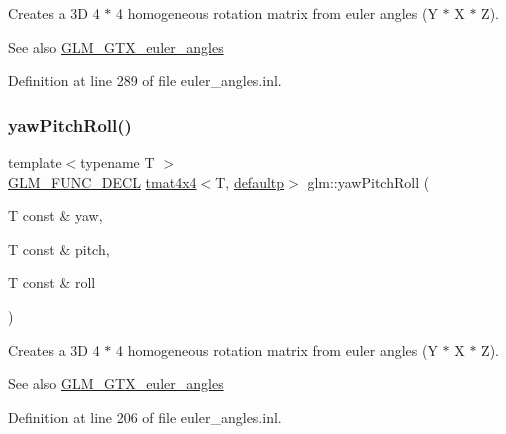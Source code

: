 Creates a 3D 4 $\ast$ 4 homogeneous rotation matrix from euler angles (Y $\ast$ X $\ast$ Z). \begin{DoxySeeAlso}{See also}
\mbox{\hyperlink{group__gtx__euler__angles}{G\+L\+M\+\_\+\+G\+T\+X\+\_\+euler\+\_\+angles}} 
\end{DoxySeeAlso}


Definition at line 289 of file euler\+\_\+angles.\+inl.

\mbox{\label{group__gtx__euler__angles_gaf9c8d0f1df88c5344165600774489bc5}} 
\subsubsection{\texorpdfstring{yawPitchRoll()}{yawPitchRoll()}}
{\footnotesize\ttfamily template$<$typename T $>$ \\
\mbox{\hyperlink{setup_8hpp_ab2d052de21a70539923e9bcbf6e83a51}{G\+L\+M\+\_\+\+F\+U\+N\+C\+\_\+\+D\+E\+CL}} \mbox{\hyperlink{structglm_1_1tmat4x4}{tmat4x4}}$<$T, \mbox{\hyperlink{namespaceglm_a0f04f086094c747d227af4425893f545a9d21ccd8b5a009ec7eb7677befc3bf51}{defaultp}}$>$ glm\+::yaw\+Pitch\+Roll (\begin{DoxyParamCaption}\item[{T const \&}]{yaw,  }\item[{T const \&}]{pitch,  }\item[{T const \&}]{roll }\end{DoxyParamCaption})}

Creates a 3D 4 $\ast$ 4 homogeneous rotation matrix from euler angles (Y $\ast$ X $\ast$ Z). \begin{DoxySeeAlso}{See also}
\mbox{\hyperlink{group__gtx__euler__angles}{G\+L\+M\+\_\+\+G\+T\+X\+\_\+euler\+\_\+angles}} 
\end{DoxySeeAlso}


Definition at line 206 of file euler\+\_\+angles.\+inl.

